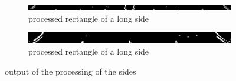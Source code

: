 \begin{figure}[h]
    \centering
    \begin{subfigure}[b]{\textwidth}
    \includegraphics[width=\textwidth]{./imgs/sobel_long_side.png}
    \caption{processed rectangle of a long side}\par
    \end{subfigure}\vspace{10pt}
    \begin{subfigure}[b]{\textwidth}
    \includegraphics[width=\textwidth]{./imgs/sobel_short_side.png}
    \caption{processed rectangle of a long side}
    \end{subfigure}
    \caption{output of the processing of the sides}
    \label{fig:sidestabol}
\end{figure}
